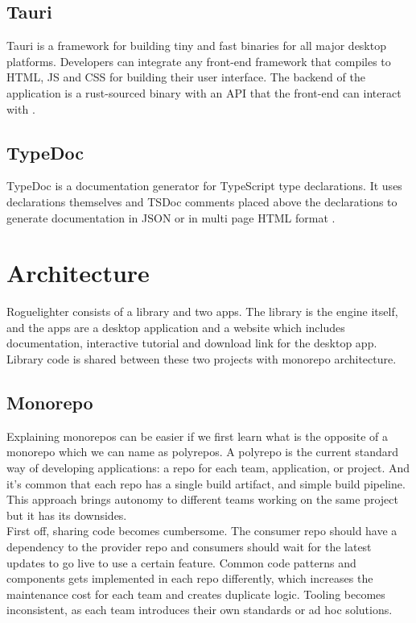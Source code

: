 \documentclass{article}
\begin{document}
\subsection{Tauri}
Tauri is a framework for building tiny and fast binaries for all major desktop platforms. Developers can integrate any front-end framework that compiles to HTML, JS and CSS for building their user interface. The backend of the application is a rust-sourced binary with an API that the front-end can interact with \cite{tauri}.

\subsection{TypeDoc}
TypeDoc is a documentation generator for TypeScript type declarations. It uses declarations themselves and TSDoc comments placed above the declarations to generate documentation in JSON or in multi page HTML format \cite{typedoc}.

\section{Architecture}
Roguelighter consists of a library and two apps. The library is the engine itself, and the apps are a desktop application and a website which includes documentation, interactive tutorial and download link for the desktop app. Library code is shared between these two projects with monorepo architecture.

\subsection{Monorepo}
Explaining monorepos can be easier if we first learn what is the opposite of a monorepo which we can name as polyrepos. A polyrepo is the current standard way of developing applications: a repo for each team, application, or project. And it's common that each repo has a single build artifact, and simple build pipeline. This approach brings autonomy to different teams working on the same project but it has its downsides.\\

First off, sharing code becomes cumbersome. The consumer repo should have a dependency to the provider repo and consumers should wait for the latest updates to go live to use a certain feature. Common code patterns and components gets implemented in each repo differently, which increases the maintenance cost for each team and creates duplicate logic. Tooling becomes inconsistent, as each team introduces their own standards or ad hoc solutions.\\
\end{document}
